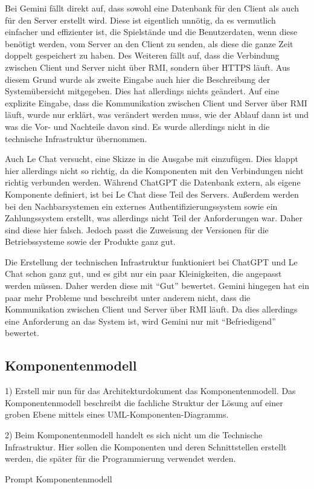 Bei Gemini fällt direkt auf, dass sowohl eine Datenbank für den Client als auch für den Server erstellt wird. Diese ist eigentlich unnötig, da es 
vermutlich einfacher und effizienter ist, die Spielstände und die Benutzerdaten, wenn diese benötigt werden, vom Server an den Client zu senden, als 
diese die ganze Zeit doppelt gespeichert zu haben. Des Weiteren fällt auf, dass die Verbindung zwischen Client und Server nicht über RMI, sondern über 
HTTPS läuft. Aus diesem Grund wurde als zweite Eingabe auch hier die Beschreibung der Systemübersicht mitgegeben. Dies hat allerdings nichts geändert. 
Auf eine explizite Eingabe, dass die Kommunikation zwischen Client und Server über RMI läuft, wurde nur erklärt, was verändert werden muss, wie der Ablauf 
dann ist und was die Vor- und Nachteile davon sind. Es wurde allerdings nicht in die technische Infrastruktur übernommen.

Auch Le Chat versucht, eine Skizze in die Ausgabe mit einzufügen. Dies klappt hier allerdings nicht so richtig, da die Komponenten mit den 
Verbindungen nicht richtig verbunden werden. Während ChatGPT die Datenbank extern, als eigene Komponente definiert, ist bei Le Chat diese 
Teil des Servers. Außerdem werden bei den Nachbarsystemen ein externes Authentifizierungssystem sowie ein Zahlungssystem erstellt, was 
allerdings nicht Teil der Anforderungen war. Daher sind diese hier falsch. Jedoch passt die Zuweisung der Versionen für die 
Betriebssysteme sowie der Produkte ganz gut.

Die Erstellung der technischen Infrastruktur funktioniert bei ChatGPT und Le Chat schon ganz gut, und es gibt nur ein paar Kleinigkeiten, die 
angepasst werden müssen. Daher werden diese mit ``Gut'' bewertet. Gemini hingegen hat ein paar mehr Probleme und beschreibt unter anderem nicht, 
dass die Kommunikation zwischen Client und Server über RMI läuft. Da dies allerdings eine Anforderung an das System ist, wird Gemini nur mit 
``Befriedigend'' bewertet.

\subsection*{Komponentenmodell}

\begin{prompt}[H]
    \begin{tcolorbox}[colback=gray!20, colframe=gray!20, boxrule=0pt, sharp corners] 
        1) Erstell mir nun für das Architekturdokument das Komponentenmodell. Das Komponentenmodell beschreibt die fachliche Struktur der Lösung auf 
        einer groben Ebene mittels eines UML-Komponenten-Diagramms.
        
        2) Beim Komponentenmodell handelt es sich nicht um die Technische Infrastruktur. Hier sollen die Komponenten und deren Schnittstellen erstellt 
        werden, die später für die Programmierung verwendet werden.
        \vfill
    \end{tcolorbox}
    \caption{Prompt Komponentenmodell}
    \label{Prompt Komponentenmodell}
\end{prompt}

